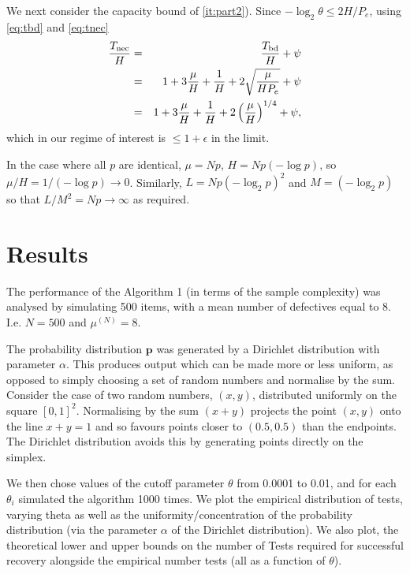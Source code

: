 \documentclass[conference]{IEEEtran}
\newcommand{\vc}[1]{{\mathbf{ #1}}}
\newcommand{\nec}{{\rm nec}}
\newcommand{\bd}{{\rm bd}}
\begin{document}
\begin{IEEEproof}
We next consider the capacity bound of \ref{it:part2}).
Since $-\log_2 \theta \leq 2 H/P_e$, using \eqref{eq:tbd}  and \eqref{eq:tnec}
\begin{eqnarray}
\frac{T_{\nec}}{H} & = & 
 \frac{T_{\bd}}{H}  + \psi \nonumber\\
&  = & 1 + 3 \frac{\mu}{H} + \frac{1}{H}  + 2 \sqrt{ \frac{ \mu}{H P_e}} + \psi \nonumber \\
& =  & 1 + 3 \frac{\mu}{H} + \frac{1}{H} + 2 \left( \frac{\mu}{H} \right)^{1/4} + \psi, \label{eq:ratio2}
\end{eqnarray}
which in our regime of interest is $\leq 1 + \epsilon$ in the limit.
\end{IEEEproof}

\begin{IEEEproof}
In the case where all $p$ are identical, $\mu = N p$, $H  = N p (-\log p)$, so $\mu/H = 1/(-\log p) \rightarrow 0$. Similarly, $L = N p (-\log_2 p)^2$ and $M = ( -\log_2 p)$
so that $L/M^2 = N p \rightarrow \infty$ as required.
\end{IEEEproof}









\section{Results}
The performance of the Algorithm 1 (in terms of the sample complexity) was analysed by simulating 500 items, with a mean number of defectives equal to 8. I.e. \(N = 500\) and \(\mu^{(N)} = 8\). 

The probability distribution \(\vc{p}\) was generated by a Dirichlet distribution with parameter $\alpha$.
This produces  output which can be made more or less uniform, as opposed to
 simply choosing a set of random numbers and normalise by the sum. Consider the case of two random numbers, \(\left(x,y\right)\), distributed uniformly on the square \(\left[0,1\right]^2\). Normalising by the sum \(\left(x+y\right)\) projects the point \(\left(x,y\right)\) onto the line \(x+y=1\) and so favours points closer to \((0.5,0.5)\) than the endpoints. The Dirichlet distribution avoids this by generating points directly on the simplex.

We then chose values of the cutoff parameter \(\theta\) from 0.0001 to 0.01, and for each \(\theta_i\) simulated the algorithm 1000 times. We plot the empirical distribution of tests, varying theta as well as the uniformity/concentration of the probability distribution (via the parameter \(\alpha\) of the Dirichlet distribution). We also plot, the theoretical lower and upper bounds on the number of Tests required for successful recovery alongside the empirical number tests (all as a function of \(\theta\)).
\end{document}
